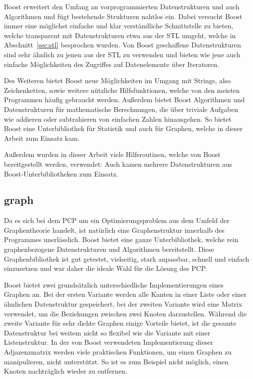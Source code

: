 Boost erweitert den Umfang an vorprogrammierten Datenstrukturen und auch Algorithmen und fügt bestehende Strukturen nahtlos ein. Dabei versucht Boost immer eine möglichst einfache und klar verständliche
Schnittstelle zu bieten, welche transparent mit Datenstrukturen etwa aus der STL umgeht, welche in Abschnitt~\ref{sec:stl} besprochen wurden. Von Boost geschaffene Datenstrukturen sind sehr ähnlich zu jenen
aus der STL zu verwenden und bieten wie jene auch einfache Möglichkeiten des Zugriffes auf Datenelemente über Iteratoren. 

Des Weiteren bietet Boost neue Möglichkeiten im Umgang mit Strings, also Zeichenketten, sowie weitere nützliche Hilfsfunktionen, welche von den meisten Programmen häufig gebraucht werden. Außerdem bietet
Boost Algorithmen und Datenstrukturen für mathematische Berechnungen, die über triviale Aufgaben wie addieren oder subtrahieren von einfachen Zahlen hinausgehen. So bietet Boost eine Unterbibliothek für 
Statistik und auch für Graphen, welche in dieser Arbeit zum Einsatz kam.

Außerdem wurden in dieser Arbeit viele Hilfsroutinen, welche von Boost bereitgestellt werden, verwendet: Auch kamen mehrere Datenstrukturen aus Boost-Unterbibliotheken zum Einsatz.

\subsection{graph}
\label{sec:boost:graph}
Da es sich bei dem PCP um ein Optimierungsproblem aus dem Umfeld der Graphentheorie handelt, ist natürlich eine Graphenstruktur innerhalb des Programmes unerlässlich. Boost bietet eine ganze Unterbibliothek, 
welche rein graphenbezogene Datenstrukturen und Algorithmen bereitstellt. Diese Graphenbibliothek ist gut getestet, vielseitig, stark anpassbar, schnell und einfach einzusetzen und war daher die ideale Wahl
für die Lösung des PCP\@.

Boost bietet zwei grundsätzlich unterschiedliche Implementierungen eines Graphen an. Bei der ersten Variante werden alle Kanten in einer Liste oder einer ähnlichen Datenstruktur gespeichert, bei
der zweiten Variante wird eine Matrix verwendet, um die Beziehungen zwischen zwei Knoten darzustellen. Während die zweite Variante für sehr dichte Graphen einige Vorteile bietet, ist die gesamte
Datenstruktur bei weitem nicht so flexibel wie die Variante mit einer Listenstruktur. In der von Boost verwendeten Implementierung dieser Adjazenzmatrix werden viele praktischen Funktionen, um einen
Graphen zu manipulieren, nicht unterstützt. So ist es zum Beispiel nicht möglich, einen Knoten nachträglich wieder zu entfernen. 

